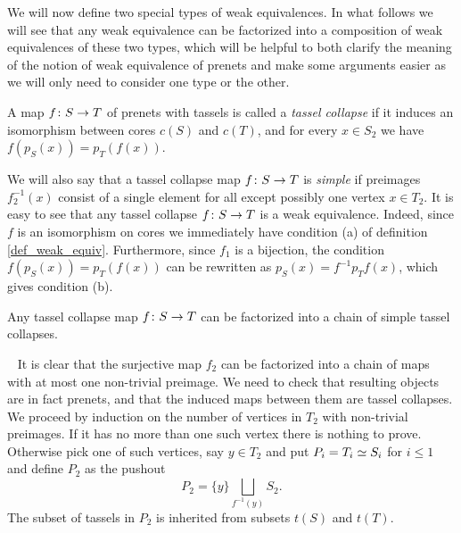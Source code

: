 \documentclass[letterpaper,12pt,leqno]{article}
\numberwithin{equation}{theorem}
\def\proof{\noindent{\em Proof:}\ }
\begin{document}
We will now define two special types of weak equivalences. In what follows we will see that any weak equivalence can be factorized into a composition of weak equivalences
of these two types, which will be helpful to both clarify the meaning of the notion of weak equivalence of prenets and make some arguments easier
as we will only need to consider one type or the other.

\begin{definition}
\label{def_tc}
A map $f\colon S \to T$ of prenets with tassels is called a {\em tassel collapse} if it induces an isomorphism between cores $c(S)$ and $c(T)$, and
for every $x \in S_2$ we have $f(p_S(x)) = p_T(f(x))$.
\end{definition}

We will also say that a tassel collapse map $f\colon S \to T$ is {\em simple} if preimages $f_2^{-1}(x)$ consist of a single element for all except possibly one vertex $x \in T_2$.
It is easy to see that any tassel collapse $f\colon S \to T$ is a weak equivalence. Indeed, since $f$ is an isomorphism on cores we immediately have condition (a) of definition \ref{def_weak_equiv}.
Furthermore, since $f_1$ is a bijection, the condition $f(p_S(x)) = p_T(f(x))$ can be rewritten as $p_S(x) = f^{-1} p_T f(x)$, which gives condition (b).

\begin{lemma}
\label{lemma_tc_factor}
Any tassel collapse map $f\colon S \to T$ can be factorized into a chain of simple tassel collapses.
\end{lemma}
\proof
It is clear that the surjective map $f_2$ can be factorized into a chain of maps with at most one non-trivial preimage. We need to check that resulting objects are in fact prenets,
and that the induced maps between them are tassel collapses. We proceed by induction on the number of vertices in $T_2$ with non-trivial preimages. If it has no more than one such
vertex there is nothing to prove. Otherwise pick one of such vertices, say $y \in T_2$ and put $P_i = T_i \simeq S_i$ for $i \le 1$ and define $P_2$ as the pushout
$$
P_2 = \{y\} \bigsqcup\limits_{f^{-1}(y)} S_2.
$$
The subset of tassels in $P_2$ is inherited from subsets $t(S)$ and $t(T)$.
\end{document}
